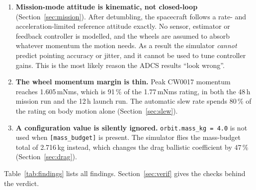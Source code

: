 \documentclass[11pt,a4paper]{article}
\newcommand{\code}[1]{\texttt{#1}}
\begin{document}
\begin{enumerate}
\item \textbf{Mission-mode attitude is kinematic, not closed-loop} (Section~\ref{sec:mission}). After detumbling, the spacecraft follows a rate- and acceleration-limited reference attitude exactly. No sensor, estimator or feedback controller is modelled, and the wheels are assumed to absorb whatever momentum the motion needs. As a result the simulator \emph{cannot} predict pointing accuracy or jitter, and it cannot be used to tune controller gains. This is the most likely reason the ADCS results ``look wrong''.
\item \textbf{The wheel momentum margin is thin.} Peak CW0017 momentum reaches 1.605\,mNms, which is 91\,\% of the 1.77\,mNms rating, in both the 48\,h mission run and the 12\,h launch run. The automatic slew rate spends 80\,\% of the rating on body motion alone (Section~\ref{sec:slew}).
\item \textbf{A configuration value is silently ignored.} \code{orbit.mass\_kg = 4.0} is not used when \code{[mass\_budget]} is present. The simulator flies the mass-budget total of 2.716\,kg instead, which changes the drag ballistic coefficient by 47\,\% (Section~\ref{sec:drag}).
\end{enumerate}

Table~\ref{tab:findings} lists all findings. Section~\ref{sec:verif} gives the checks behind the verdict.
\end{document}
